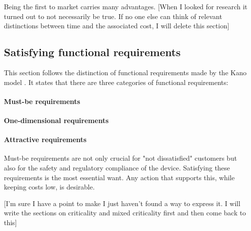 Being the first to market carries many advantages. [When I looked for research it turned out to not necessarily be true. If no one else can think of relevant distinctions between time and the associated cost, I will delete this section]
\subsection{Satisfying functional requirements}
This section follows the distinction of functional requirements made by the  Kano model \autocite{KanoNoriaki.1984}. 
It states that there are three categories of functional requirements: 
\paragraph{Must-be requirements}  \autocite{ElmarSauerwein.1996}

\paragraph{One-dimensional requirements} \autocite{ElmarSauerwein.1996} 

\paragraph{Attractive requirements} \autocite{ElmarSauerwein.1996}

Must-be requirements are not only crucial for "not dissatisfied" customers but also for the safety and regulatory compliance of the device. Satisfying these requirements is the most essential want. Any action that supports this, while keeping costs low, is desirable.

[I'm sure I have a point to make I just haven't found a way to express it. I will write the sections on criticality and mixed criticality first and then come back to this]

\begin{comment}
In projects that consist purely of software, customer dissatisfaction is the only negative factor. Projects that also require custom hardware have an additional cost. The hardware already needs to implement every functionality and all manufactured devices need to support it. If the feature is then not implemented the hardware costs more without offering the benefits.
\end{comment}

